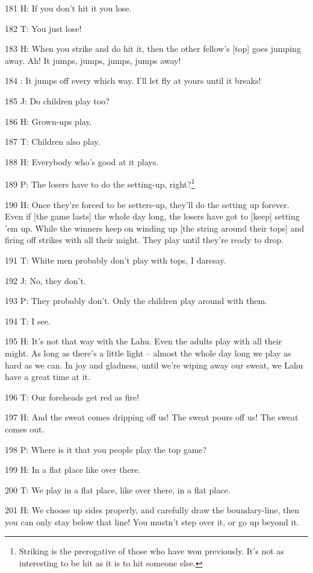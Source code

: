 181 H: If you don't hit it you lose.

182 T: You just lose!

183 H: When you strike and do hit it, then the other fellow's [top] goes jumping
away. Ah! It jumps, jumps, jumps, jumps away!

184 : It jumps off every which way. I'll let fly at yours until it breaks!

185 J: Do children play too?

186 H: Grown-ups play.

187 T: Children also play.

188 H: Everybody who's good at it plays.

189 P: The losers have to do the setting-up, right?\footnote{Striking is the prerogative of those who have won previously. It's not as interesting to be hit as it is to hit someone else.}

190 H: Once they're forced to be setters-up, they'll do the setting up forever.
Even if [the game lasts] the whole day long, the losers have got to [keep] setting
'em up. While the winners keep on winding up [the string around their tops] and
firing off strikes with all their might. They play until they're ready to drop.

191 T: White men probably don't play with tops, I daresay.

192 J: No, they don't.

193 P: They probably don't. Only the children play around with them.

194 T: I see.

195 H: It's not that way with the Lahu. Even the adults play with all their might.
As long as there's a little light -- almost the whole day long we play as hard
as we can. In joy and gladness, until we're wiping away our sweat, we Lahu have
a great time at it.

196 T: Our foreheads get red as fire!

197 H: And the sweat comes dripping off us! The sweat pours off us! The sweat comes
out.

198 P: Where is it that you people play the top game?

199 H: In a flat place like over there.

200 T: We play in a flat place, like over there, in a flat place.

201 H: We choose up sides properly, and carefully draw the boundary-line, then
you can only stay below that line! You mustn't step over it, or go up beyond it.

